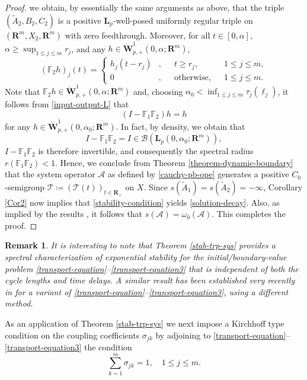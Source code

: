 \documentclass[a4paper,11pt,reqno]{amsart}
\def\calB{{\calB}}
\def\calT{{\mathcal{T}}}
\def\calB{{\mathcal{B}}}
\def\calA{{\mathcal{A}}}
\def\R{\mathbf{R}}
\theoremstyle{plain}
\newtheorem{remark}{Remark}[section]
\numberwithin{equation}{section}
\begin{document}
\begin{proof}
we obtain, by essentially the same arguments as above, that the triple $(\tilde{A}_2,B_2,C_2)$ is a positive $\bm{L}_p$-well-posed uniformly regular triple on $(\R^m,X_2,\R^m)$ with zero feedthrough. Moreover, for all $t\in [0,\alpha]$, $\alpha\ge \sup_{1\le j\le m}r_j$, and any $h\in \mathring{\bm{W}}^{1}_{p,+}(0,\alpha;\R^m)$,
\begin{equation*}
(\mathbb{F}_2h)_j(t)= \left\{\begin{split}
h_j(t-r_j)&,&& t\ge r_j,&& 1\le j\le m,\\
 0&,&&\text{otherwise},&& 1\le j\le m.
\end{split}\right.
\end{equation*}
Note that $\mathbb{F}_2h \in \mathring{\bm{W}}^{1}_{p,+}(0,\alpha;\R^m)$ and, choosing $\alpha_0<\inf_{1\le j\le m}\tau_j(\ell_j)$, it follows from \eqref{input-output-L} that
\begin{equation*}
(I-\mathbb{F}_1\mathbb{F}_2)h=h
\end{equation*}
for any $h\in \mathring{\bm{W}}^{1}_{p,+}(0,\alpha_0;\R^m)$. In fact, by density, we obtain that
\begin{equation*}
I-\mathbb{F}_1\mathbb{F}_2=I\in\calB({\bm L}_p(0,\alpha_0;\R^m)),
\end{equation*} 
$I-\mathbb{F}_1\mathbb{F}_2$ is therefore invertible, and consequently the spectral radius $r(\mathbb{F}_1\mathbb{F}_2)<1$. Hence, we conclude from Theorem \ref{theorem-dynamic-boundary} that the system operator $\calA$ as defined by \eqref{cauchy-pb-ope} generates a positive $C_0$-semigroup $\calT\coloneqq (\calT(t))_{t\in\R_+}$ on $X$. Since $s(\tilde{A}_1)=s(\tilde{A}_2)=-\infty$, Corollary \ref{Cor2} now implies that \eqref{stability-condition} yields \eqref{solution-decay}. Also, as implied by the results \cite{MR1469440}, it follows that $s(\calA)=\omega_0(\calA)$. This completes the proof.
\end{proof}

\begin{remark}
It is interesting to note that Theorem \ref{stab-trp-sys} provides a spectral characterization of exponential stability for the initial/boundary-value problem \eqref{transport-equation}--\eqref{transport-equation3} that is independent of both the cycle lengths and time delays. A similar result has been established very recently in \cite{EZZL} for a variant of \eqref{transport-equation}--\eqref{transport-equation3}, using a different method.
\end{remark}

As an application of Theorem \ref{stab-trp-sys} we next impose a Kirchhoff type condition on the coupling coefficients $\sigma_{jk}$ by adjoining to \eqref{transport-equation}--\eqref{transport-equation3} the condition
\begin{equation}\label{Kirchhoff}
\sum_{k=1}^m \sigma_{jk}=1, \quad 1 \le j\le m.
\end{equation}
\end{document}
